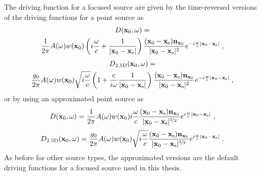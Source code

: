 The driving function for a focused source are given by the time-reversed
versions of the driving functions for a point source as
%
\begin{multline}
    D(\x_0,\omega) = \\
    \frac{1}{2\pi} A(\omega) w(\x_0) \left(i\omegac +
    \frac{1}{|\x_0-\xs|} \right) \frac{(\x_0-\xs)\n_{\x_0}}{|\x_0-\xs|^2}
    e^{-i\omegac |\x_0-\xs|} \qc
    \label{eq:D_wfs_fs_without_approximation}
\end{multline}
%
\begin{multline}
    D_\twohalfD(\x_0,\omega) = \\
    \frac{g_0}{2\pi} A(\omega) w(\x_0) \sqrt{i\omegac} \left(
    1 + \frac{c}{i\omega} \frac{1}{|\x_0-\xs|}
    \right) \frac{(\x_0-\xs) \n_{\x_0}}{|\x_0-\xs|^2} e^{-i\omegac |\x_0-\xs|}
    \qc
    \label{eq:D_wfs_fs_25D_without_approximation}
\end{multline}
%
or by using an approximated point source as
%
\begin{equation}
    D(\x_0,\omega) = \frac{1}{2\pi} A(\omega) w(\x_0) i\omegac
    \frac{(\x_0-\xs)\n_{\x_0}}{|\x_0-\xs|^{\nicefrac{3}{2}}}
    e^{i\omegac |\x_0-\xs|} \qc
    \label{eq:D_wfs_fs}
\end{equation}
%
\begin{equation}
    D_\twohalfD(\x_0,\omega) = \frac{g_0}{2\pi} A(\omega) w(\x_0) \sqrt{i\omegac}
    \frac{(\x_0-\xs)\n_{\x_0}}{|\x_0-\xs|^{\nicefrac{3}{2}}}
    e^{i\omegac |\x_0-\xs|} \qp
    \label{eq:D_wfs_fs_25D}
\end{equation}
%
As before for other source types, the approximated versions are the default driving functions for a focused
source used in this thesis.

